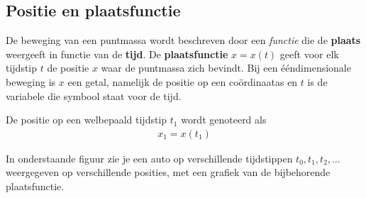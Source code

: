 \documentclass{ximera}
\begin{document}
	\author{Bart Lambregs}
    \xmsource\xmuitleg










	\subsection*{Positie en plaatsfunctie}


	De beweging van een puntmassa wordt beschreven door een \textit{functie} die de \textbf{plaats} weergeeft in functie van de \textbf{tijd}. 
	De \textbf{plaatsfunctie} $x = x(t)$ geeft voor elk tijdstip \(t\) de positie \(x\) waar de puntmassa zich bevindt. 
	Bij een ééndimensionale beweging is $x$ een getal, namelijk de positie op een coördinaatas
	en $t$ is de variabele die symbool staat voor de tijd.
	

	De positie op een welbepaald tijdstip $t_1$ wordt genoteerd als 
	\begin{eqnarray*}
	x_1=x(t_1)
	\end{eqnarray*}

	In onderstaande figuur zie je een auto op verschillende tijdstippen $t_0,t_1, t_2,\ldots$ weergegeven op verschillende posities, met een grafiek van de bijbehorende plaatsfunctie.
	
\end{document}
